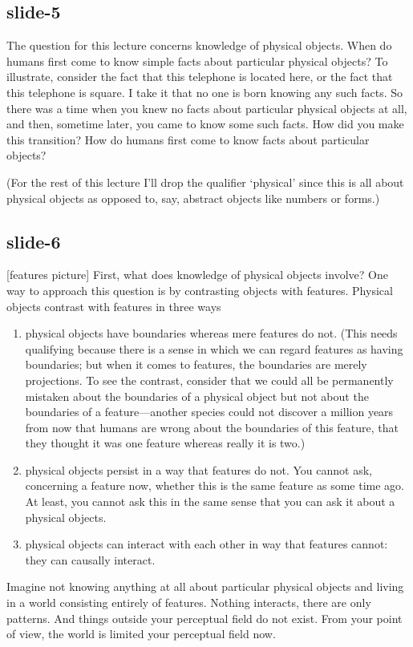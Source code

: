 \documentclass[12pt,\papersize]{extarticle}
\begin{document}
\subsection{slide-5}
The question for this lecture concerns knowledge of physical objects.
When do humans first come to know simple facts about particular physical objects?
To illustrate, consider the fact that this telephone is located here,
or the fact that this telephone is square.
I take it that no one is born knowing any such facts.
So there was a time when you knew no facts about particular physical objects at all,
and then, sometime later, you came to know some such facts.
How did you make this transition?
How do humans first come to know facts about particular objects?
 
(For the rest of this lecture 
I'll drop the qualifier `physical' since this is all about physical objects as opposed to, 
say, abstract objects like numbers or forms.)
 
\subsection{slide-6}
[features picture]
First, what does knowledge of physical objects involve?
One way to approach this question is by contrasting objects with features.
Physical objects contrast with features in three ways
%
\begin{enumerate}
%
\item physical objects have boundaries whereas mere features do not. (This needs qualifying 
because there is a sense in which we can regard features as having boundaries; but when it 
comes to 
features, the boundaries are merely projections.  To see the contrast, consider that we could 
all be permanently mistaken about the boundaries of a physical object but not about the 
boundaries of a feature---another species could not discover a million years from now that 
humans are wrong about the boundaries of this feature, that they thought it was one feature
whereas really it is two.)
%
\item physical objects persist in a way that features do not.  You cannot ask, concerning a 
feature now, whether this is the same feature as some time ago.  At least, you cannot ask this
in the same sense that you can ask it about a physical objects.
%
\item physical objects can interact with each other in way that features cannot: they
can causally interact.
%
\end{enumerate}
%
Imagine not knowing anything at all about particular physical objects and living in a world
consisting entirely of features.  Nothing interacts, there are only patterns.
And things outside your perceptual field do not exist.
From your point of view, the world is limited your perceptual field now.
 
\end{document}
